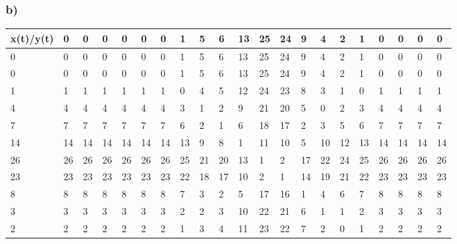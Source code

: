 \documentclass{article}
\begin{document}
\subsubsection*{b)}
\begin{adjustbox}{width=\textwidth,totalheight=\textheight,keepaspectratio}
    \begin{tabular}{l|llllllllllllllllllll}
    x(t)/y(t) & 0  & 0  & 0  & 0  & 0  & 0 & 1 & 5 & 6  & 13  & 25  & 24  & 9  & 4  & 2  & 1  & 0  & 0  & 0  & 0  \\ \hline
    0         & \cellcolor[HTML]{EFEFEF} 0  & 0  & 0  & 0  & 0  & 0  & 1  & 5  & 6  & 13 & 25 & 24 & 9  & 4  & 2  & 1  & 0  & 0  & 0  & 0  \\
    0         & 0  &\cellcolor[HTML]{EFEFEF} 0  & \cellcolor[HTML]{EFEFEF}0  & \cellcolor[HTML]{EFEFEF}0  &\cellcolor[HTML]{EFEFEF} 0  &\cellcolor[HTML]{EFEFEF} 0  & 1  & 5  & 6  & 13 & 25 & 24 & 9  & 4  & 2  & 1  & 0  & 0  & 0  & 0  \\
    1         & 1  & 1  & 1  & 1  & 1  & 1  &\cellcolor[HTML]{EFEFEF} 0  & 4  & 5  & 12 & 24 & 23 & 8  & 3  & 1  & 0  & 1  & 1  & 1  & 1  \\
    4         & 4  & 4  & 4  & 4  & 4  & 4  & 3  &\cellcolor[HTML]{EFEFEF} 1  & 2  & 9  & 21 & 20 & 5  & 0  & 2  & 3  & 4  & 4  & 4  & 4  \\
    7         & 7  & 7  & 7  & 7  & 7  & 7  & 6  & 2  &\cellcolor[HTML]{EFEFEF} 1  & 6  & 18 & 17 & 2  & 3  & 5  & 6  & 7  & 7  & 7  & 7  \\
    14         & 14 & 14 & 14 & 14 & 14 & 14 & 13 & 9  & 8  &\cellcolor[HTML]{EFEFEF} 1  & 11 & 10 & 5  & 10 & 12 & 13 & 14 & 14 & 14 & 14 \\
    26         & 26 & 26 & 26 & 26 & 26 & 26 & 25 & 21 & 20 & 13 &\cellcolor[HTML]{EFEFEF} 1  & 2  & 17 & 22 & 24 & 25 & 26 & 26 & 26 & 26 \\
    23         & 23 & 23 & 23 & 23 & 23 & 23 & 22 & 18 & 17 & 10 & 2  &\cellcolor[HTML]{EFEFEF} 1  & 14 & 19 & 21 & 22 & 23 & 23 & 23 & 23 \\
    8         & 8  & 8  & 8  & 8  & 8  & 8  & 7  & 3  & 2  & 5  & 17 & 16 &\cellcolor[HTML]{EFEFEF} 1  & 4  & 6  & 7  & 8  & 8  & 8  & 8  \\
    3        & 3  & 3  & 3  & 3  & 3  & 3  & 2  & 2  & 3  & 10 & 22 & 21 & 6  &\cellcolor[HTML]{EFEFEF} 1  & 1  & 2  & 3  & 3  & 3  & 3  \\
    2        & 2  & 2  & 2  & 2  & 2  & 2  & 1  & 3  & 4  & 11 & 23 & 22 & 7  & 2  & \cellcolor[HTML]{EFEFEF}0  & 1  & 2  & 2  & 2  & 2  \\

\end{tabular}
\end{adjustbox}
\end{document}
